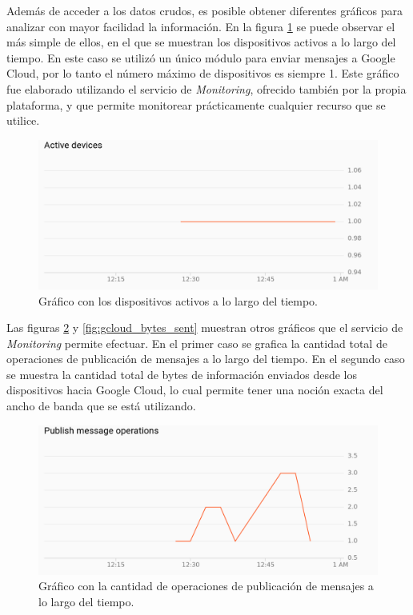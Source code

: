 Además de acceder a los datos crudos, es posible obtener diferentes gráficos para analizar con mayor facilidad la información. En la figura \ref{fig:gcloud_active_devices} se puede observar el más simple de ellos, en el que se muestran los dispositivos activos a lo largo del tiempo. En este caso se utilizó un único módulo para enviar mensajes a Google Cloud, por lo tanto el número máximo de dispositivos es siempre 1. Este gráfico fue elaborado utilizando el servicio de \emph{Monitoring}, ofrecido también por la propia plataforma, y que permite monitorear prácticamente cualquier recurso que se utilice.

\begin{figure}[h]
\centering
\includegraphics[width=\textwidth]{./Figures/gcloud_active_devices.png}
\caption{Gráfico con los dispositivos activos a lo largo del tiempo.}
\label{fig:gcloud_active_devices}
\end{figure}

Las figuras \ref{fig:gcloud_publish_operations} y \ref{fig:gcloud_bytes_sent} muestran otros gráficos que el servicio de \emph{Monitoring} permite efectuar. En el primer caso se grafica la cantidad total de operaciones de publicación de mensajes a lo largo del tiempo. En el segundo caso se muestra la cantidad total de bytes de información enviados desde los dispositivos hacia Google Cloud, lo cual permite tener una noción exacta del ancho de banda que se está utilizando.

\begin{figure}[h]
\centering
\includegraphics[width=\textwidth]{./Figures/gcloud_publish_operations.png}
\caption{Gráfico con la cantidad de operaciones de publicación de mensajes a lo largo del tiempo.}
\label{fig:gcloud_publish_operations}
\end{figure}

